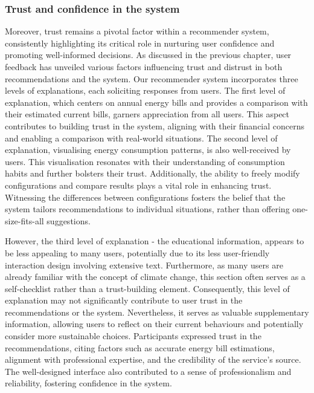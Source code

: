 \subsubsection*{Trust and confidence in the system}

Moreover, trust remains a pivotal factor within a recommender system, consistently highlighting its critical role in nurturing user confidence and promoting well-informed decisions.
As discussed in the previous chapter, user feedback has unveiled various factors influencing trust and distrust in both recommendations and the system. 
Our recommender system incorporates three levels of explanations, each soliciting responses from users.
The first level of explanation, which centers on annual energy bills and provides a comparison with their estimated current bills, garners appreciation from all users. 
This aspect contributes to building trust in the system, aligning with their financial concerns and enabling a comparison with real-world situations. 
The second level of explanation, visualising energy consumption patterns, is also well-received by users. 
This visualisation resonates with their understanding of consumption habits and further bolsters their trust. 
Additionally, the ability to freely modify configurations and compare results plays a vital role in enhancing trust. 
Witnessing the differences between configurations fosters the belief that the system tailors recommendations to individual situations, rather than offering one-size-fits-all suggestions. 

However, the third level of explanation - the educational information, appears to be less appealing to many users, potentially due to its less user-friendly interaction design involving extensive text. 
Furthermore, as many users are already familiar with the concept of climate change, this section often serves as a self-checklist rather than a trust-building element. 
Consequently, this level of explanation may not significantly contribute to user trust in the recommendations or the system. 
Nevertheless, it serves as valuable supplementary information, allowing users to reflect on their current behaviours and potentially consider more sustainable choices.
Participants expressed trust in the recommendations, citing factors such as accurate energy bill estimations, alignment with professional expertise, and the credibility of the service's source. 
The well-designed interface also contributed to a sense of professionalism and reliability, fostering confidence in the system.


